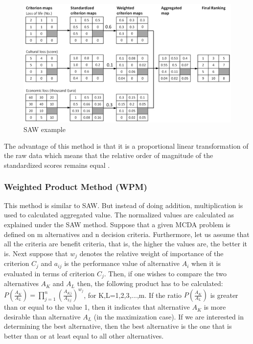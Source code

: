 \begin{figure}[ht]
  \includegraphics[width=\textwidth]{Figures/background/04_saw_method_web.jpg}
  \caption{SAW example \cite{SAWillustration}}
  \label{fig:SAW}
\end{figure}

The advantage of this method is that it is a proportional linear transformation of the raw data which means that the relative order of magnitude of the standardized scores remains equal \cite{SAW}. 

\subsubsection{Weighted Product Method (WPM)}
This method is similar to SAW.
But instead of doing addition, multiplication is used to calculated aggregated value\cite{WPM}. The normalized values are calculated as explained under the SAW method.
Suppose that a given MCDA problem is defined on m alternatives and n decision criteria. Furthermore, let us assume that all the criteria are benefit criteria, that is, the higher the values are, the better it is. Next suppose that $w_{j}$ denotes the relative weight of importance of the criterion $C_{j}$ and $a_{ij}$ is the performance value of alternative $A_{i}$ when it is evaluated in terms of criterion $C_{j}$. Then, if one wishes to compare the two alternatives $A_{K}$ and $A_{L}$ then, the following product has to be calculated:
$P(\frac{A_{K}}{A_{L}})=\prod_{j=1}^{n}(\frac{A_{Kj}}{A_{Lj}})^{w_{j}}$, for K,L=1,2,3,...,m.
If the ratio $P(\frac{A_{K}}{A_{L}})$ is greater than or equal to the value 1, then it indicates that alternative $A_{K}$ is more desirable than alternative $A_{L}$ (in the maximization case). If we are interested in determining the best alternative, then the best alternative is the one that is better than or at least equal to all other alternatives.

